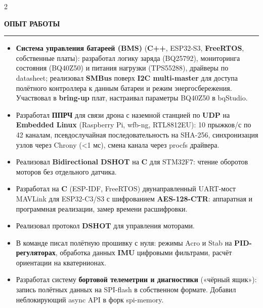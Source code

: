 \documentclass[10pt,a4paper,ragged2e,withhyper]{altacv}
\renewcommand{\cvsectionfont}{\Large\rmfamily\bfseries\iftutex\addfontfeatures{Kerning=Off}\fi}
\renewcommand{\cvsection}[1]{%
  \nointerlineskip\medskip%
  {\color{heading}\cvsectionfont\MakeUppercase{#1}}\\[-1ex]%
  {\color{headingrule}\rule{\linewidth}{2pt}\par}\smallskip
}
\begin{document}
\begin{paracol}{2}

  \cvsection{Опыт работы}


  \begin{itemize}
    \item \textbf{Система управления батареей (BMS)} (\textbf{C++}, ESP32-S3, \textbf{FreeRTOS}, собственные платы): разработал логику заряда (BQ25792), мониторинга состояния (BQ40Z50) и питания нагрузки (TPS55288), драйверы по datasheet; реализовал \textbf{SMBus} поверх \textbf{I2C multi-master} для доступа полётного контроллера к данным батареи и режим энергосбережения. Участвовал в \textbf{bring-up} плат, настраивал параметры BQ40Z50 в bqStudio.
    \item Разработал \textbf{ППРЧ} для связи дрона с наземной станцией по \textbf{UDP} на \textbf{Embedded Linux} (Raspberry Pi, wfb-ng, RTL8812EU): 10 прыжков/с по 42 каналам, псевдослучайная последовательность на SHA-256, синхронизация узлов через Chrony (<1 мс), смена канала через procfs драйвера.
    \item Реализовал \textbf{Bidirectional DSHOT} на \textbf{C} для STM32F7: чтение оборотов моторов без отдельного датчика. \newline {}
    \item Разработал на \textbf{C} (ESP-IDF, FreeRTOS) двунаправленный UART-мост MAVLink для ESP32-C3/S3 с шифрованием \textbf{AES-128-CTR}: аппаратная и программная реализации, замер времени расшифровки.
  \end{itemize}

  \begin{itemize}
    \item Реализовал протокол \textbf{DSHOT} для управления моторами. \newline {}
    \item В команде писал полётную прошивку с нуля: режимы Acro и Stab на \textbf{PID-регуляторах}, обработка данных \textbf{IMU} цифровыми фильтрами, расчёт ориентации на кватернионах.
    \item Разработал систему \textbf{бортовой телеметрии и диагностики} («чёрный ящик»): запись полётных данных на SPI-flash в собственном формате. Добавил неблокирующий async API в форк spi-memory. \newline {}
  \end{itemize}


\end{paracol}
\end{document}
